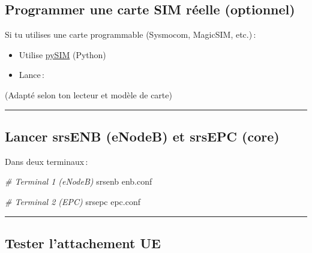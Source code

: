\documentclass[
]{article}
\newenvironment{Shaded}{\begin{snugshade}}{\end{snugshade}}
\newcommand{\AttributeTok}[1]{\textcolor[rgb]{0.13,0.29,0.53}{#1}}
\newcommand{\CommentTok}[1]{\textcolor[rgb]{0.56,0.35,0.01}{\textit{#1}}}
\newcommand{\ExtensionTok}[1]{#1}
\newcommand{\NormalTok}[1]{#1}
\newcommand{\VariableTok}[1]{\textcolor[rgb]{0.00,0.00,0.00}{#1}}
\providecommand{\tightlist}{%
  \setlength{\itemsep}{0pt}\setlength{\parskip}{0pt}}
\begin{document}
\subsection{Programmer une carte SIM réelle
(optionnel)}\label{programmer-une-carte-sim-ruxe9elle-optionnel}

Si tu utilises une carte programmable (Sysmocom, MagicSIM, etc.)\,:

\begin{itemize}
\tightlist
\item
  Utilise \href{https://github.com/osmocom/pysim}{pySIM} (Python)
\item
  Lance\,:
\end{itemize}

\begin{Shaded}
\end{Shaded}

(Adapté selon ton lecteur et modèle de carte)

\begin{center}\rule{0.5\linewidth}{0.5pt}\end{center}

\subsection{Lancer srsENB (eNodeB) et srsEPC
(core)}\label{lancer-srsenb-enodeb-et-srsepc-core}

Dans deux terminaux\,:

\begin{Shaded}
\begin{Highlighting}[]
\CommentTok{\# Terminal 1 (eNodeB)}
\ExtensionTok{srsenb}\NormalTok{ enb.conf}

\CommentTok{\# Terminal 2 (EPC)}
\ExtensionTok{srsepc}\NormalTok{ epc.conf}
\end{Highlighting}
\end{Shaded}

\begin{center}\rule{0.5\linewidth}{0.5pt}\end{center}

\subsection{Tester l'attachement UE}\label{tester-lattachement-ue}
\end{document}
